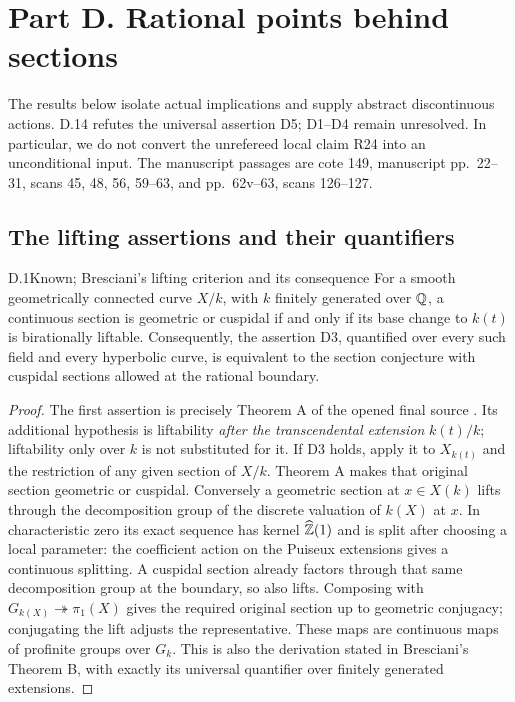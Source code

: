 \section{Part D. Rational points behind sections}
\label{sec:partD}

The results below isolate actual implications and supply abstract
discontinuous actions. D.14 refutes the universal assertion D5;
D1--D4 remain unresolved. In particular, we do
not convert the unrefereed local claim R24 into an unconditional input.
The manuscript passages are cote 149, manuscript pp.~22--31,
scans 45, 48, 56, 59--63, and pp.~62v--63, scans 126--127.

\subsection{The lifting assertions and their quantifiers}

\begin{claim}{D.1}{Known; Bresciani's lifting criterion and its consequence}
For a smooth geometrically connected curve $X/k$, with $k$ finitely
generated over $\mathbb Q$, a continuous section is geometric or cuspidal
if and only if its base change to $k(t)$ is birationally liftable.
Consequently, the assertion D3, quantified over every such field and
every hyperbolic curve, is equivalent to the section conjecture with
cuspidal sections allowed at the rational boundary.
\end{claim}
\begin{proof}
The first assertion is precisely Theorem A of the opened final source
\citet{D_Bresciani2023}. Its additional hypothesis is liftability
\emph{after the transcendental extension} $k(t)/k$; liftability only
over $k$ is not substituted for it.
If D3 holds, apply it to $X_{k(t)}$ and the restriction of any given
section of $X/k$. Theorem A makes that original section geometric or
cuspidal. Conversely a geometric section at $x\in X(k)$ lifts through
the decomposition group of the discrete valuation of $k(X)$ at $x$.
In characteristic zero its exact sequence has kernel
$\widehat{\mathbb Z}(1)$ and is split after choosing a local parameter:
the coefficient action on the Puiseux extensions gives a continuous
splitting. A cuspidal section already factors through that same
decomposition group at the boundary, so also lifts. Composing with
$G_{k(X)}\twoheadrightarrow\pi_1(X)$ gives the required original
section up to geometric conjugacy; conjugating the lift adjusts the
representative. These maps are continuous maps of profinite groups
over $G_k$. This is also the derivation stated in Bresciani's
Theorem B, with exactly its universal quantifier over finitely
generated extensions.
\end{proof}

